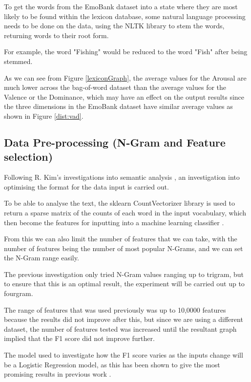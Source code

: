 To get the words from the EmoBank dataset into a state where they are most likely to be found within the lexicon database, some natural language processing needs to be done on the data, using the NLTK \cite{NLTKBook} library to stem the words, returning words to their root form.

For example, the word "Fishing" would be reduced to the word "Fish" after being stemmed. 

As we can see from Figure \ref{lexiconGraph}, the average values for the Arousal are much lower across the bag-of-word dataset than the average values for the Valence or the Dominance, which may have an effect on the output results since the three dimensions in the EmoBank dataset have similar average values as shown in Figure \ref{dist:vad}.


\subsection{Data Pre-processing (N-Gram and Feature selection)}

Following R. Kim's investigations into semantic analysis \cite{towardsDS}, an investigation into optimising the format for the data input is carried out. 

To be able to analyse the text, the sklearn CountVectorizer library is used to return a sparse matrix of the counts of each word in the input vocabulary, which then become the features for inputting into a machine learning classifier \cite{sklearn}.

From this we can also limit the number of features that we can take, with the number of features being the number of most popular N-Grams, and we can set the N-Gram range easily. 

The previous investigation only tried N-Gram values ranging up to trigram, but to ensure that this is an optimal result, the experiment will be carried out up to fourgram.

The range of features that was used previously was up to 10,0000 features because the results did not improve after this, but since we are using a different dataset, the number of features tested was increased until the resultant graph implied that the F1 score did not improve further. 

The model used to investigate how the F1 score varies as the inputs change will be a Logistic Regression model, as this has been shown to give the most promising results in previous work \cite{towardsDS}.


